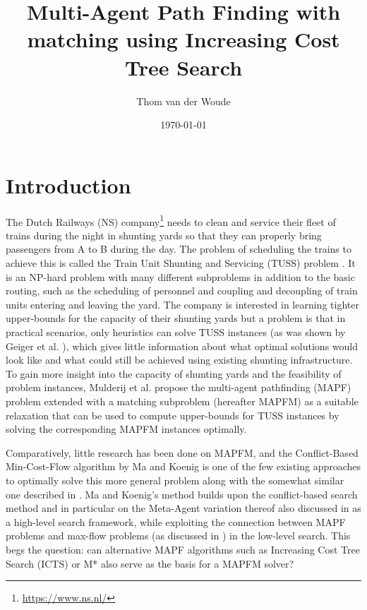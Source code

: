 \documentclass[english]{article}
\begin{document}
\title{Multi-Agent Path Finding with matching using Increasing Cost Tree Search}

\author{Thom van der Woude}
\date{\today}

\maketitle


\section{Introduction}The Dutch Railways (NS) company\footnote{\url{https://www.ns.nl/}} needs to clean and service their fleet of trains during the night in shunting yards so that they can properly bring passengers from A to B during the day. The problem of scheduling the trains to achieve this is called the Train Unit Shunting and Servicing (TUSS) problem \cite{mulderij2020}. It is an NP-hard problem with many different subproblems in addition to the basic routing, such as the scheduling of personnel and coupling and decoupling of train units entering and leaving the yard. The company is interested in learning tighter upper-bounds for the capacity of their shunting yards but a problem is that in practical scenarios, only heuristics can solve TUSS instances (as was shown by Geiger et al. \cite{geiger2018}), which gives little information about what optimal solutions would look like and what could still be achieved using existing shunting infrastructure. To gain more insight into the capacity of shunting yards and the feasibility of problem instances, Mulderij et al. \cite{mulderij2020} propose the multi-agent pathfinding (MAPF) problem \cite{stern2019} extended with a matching subproblem (hereafter MAPFM) as a suitable relaxation that can be used to compute upper-bounds for TUSS instances by solving the corresponding MAPFM instances optimally.

Comparatively, little research has been done on MAPFM, and the Conflict-Based Min-Cost-Flow algorithm by Ma and Koenig \cite{ma2016} is one of the few existing approaches to optimally solve this more general problem along with the somewhat similar one described in \cite{henkel2019}. Ma and Koenig's method builds upon the conflict-based search method and in particular on the Meta-Agent variation thereof also discussed in \cite{sharon2015} as a high-level search framework, while exploiting the connection between MAPF problems and max-flow problems (as discussed in \cite{yu2013}) in the low-level search. This begs the question: can alternative MAPF algorithms such as Increasing Cost Tree Search (ICTS) \cite{sharon2011} or M* \cite{wagner2011} also serve as the basis for a MAPFM solver?
\end{document}
